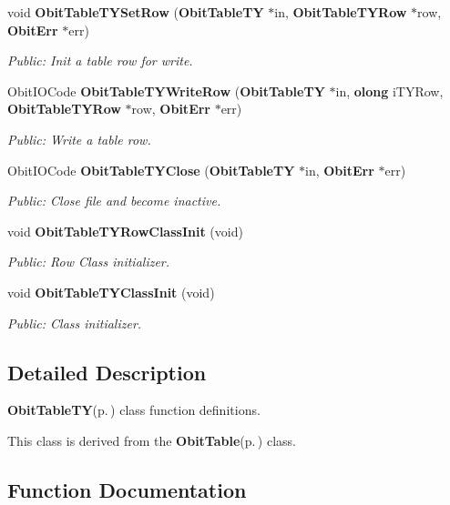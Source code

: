 \begin{CompactItemize}
void {\bf Obit\-Table\-TYSet\-Row} ({\bf Obit\-Table\-TY} $\ast$in, {\bf Obit\-Table\-TYRow} $\ast$row, {\bf Obit\-Err} $\ast$err)
\begin{CompactList}\small\item\em Public: Init a table row for write. \item\end{CompactList}\item 
Obit\-IOCode {\bf Obit\-Table\-TYWrite\-Row} ({\bf Obit\-Table\-TY} $\ast$in, {\bf olong} i\-TYRow, {\bf Obit\-Table\-TYRow} $\ast$row, {\bf Obit\-Err} $\ast$err)
\begin{CompactList}\small\item\em Public: Write a table row. \item\end{CompactList}\item 
Obit\-IOCode {\bf Obit\-Table\-TYClose} ({\bf Obit\-Table\-TY} $\ast$in, {\bf Obit\-Err} $\ast$err)
\begin{CompactList}\small\item\em Public: Close file and become inactive. \item\end{CompactList}\item 
void {\bf Obit\-Table\-TYRow\-Class\-Init} (void)
\begin{CompactList}\small\item\em Public: Row Class initializer. \item\end{CompactList}\item 
void {\bf Obit\-Table\-TYClass\-Init} (void)
\begin{CompactList}\small\item\em Public: Class initializer. \item\end{CompactList}\end{CompactItemize}


\subsection{Detailed Description}
{\bf Obit\-Table\-TY}{\rm (p.\,\pageref{structObitTableTY})} class function definitions. 

This class is derived from the {\bf Obit\-Table}{\rm (p.\,\pageref{structObitTable})} class.

\subsection{Function Documentation}

